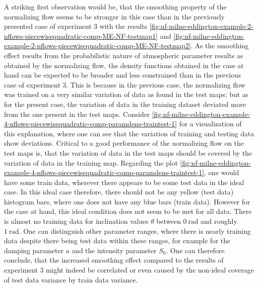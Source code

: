 \documentclass[a4paper,12pt]{report}
\def\lk#1{{\color{black}{#1}}}
\begin{document}
A striking first observation would be, that the smoothing property of the normalizing flow seems to be stronger in this case than in the previously presented case of experiment 3 with the results \cref{fig:nf-milne-eddington-example-2-nflows-piecewisequadratic-comp-ME-NF-testmap1} and \cref{fig:nf-milne-eddington-example-2-nflows-piecewisequadratic-comp-ME-NF-testmap2}. As the smoothing effect results from the probabilistic nature of atmospheric parameter results as obtained by the normalizing flow, the density functions obtained in the case at hand can be expected to be broader and less constrained than in the previous case of experiment 3. This is because in the previous case, the normalizing flow was trained on a very similar variation of data as found in the test maps; but as for the present case, the variation of data in the training dataset deviated more from the one present in the test maps. Consider \cref{fig:nf-milne-eddington-example-4-nflows-piecewisequadratic-comp-paramdens-traintest-1} for a visualization of this explanation, where one can see that the variation of training and testing data show deviations. Critical to a good performance of the normalizing flow on the test maps is, that the variation of data in the test maps should be covered by the variation of data in the training map. Regarding the plot \cref{fig:nf-milne-eddington-example-4-nflows-piecewisequadratic-comp-paramdens-traintest-1}, one would have some train data, wherever there appears to be some test data in the ideal case. In this ideal case therefore, there should not be any yellow (test data) histogram bars, where one does not have any blue bars (train data). However for the case at hand, this ideal condition does not seem to be met for all data. There is almost no training data for inclination values $\theta$ between $\SI{0}{\radian}$ and roughly $\SI{1}{\radian}$. One can distinguish other parameter ranges, where there is nearly \lk{no} training data despite there being test data within these ranges, for example for the damping parameter $a$ and the intensity parameter $S_0$. One can therefore conclude, that the increased smoothing effect compared to the results of experiment 3 might indeed be correlated or even caused by the non-ideal coverage of test data variance by train data variance.
\end{document}
